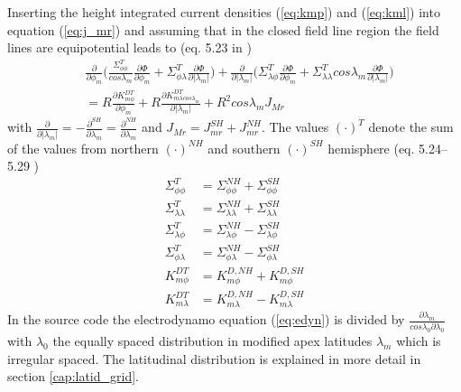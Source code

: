 %
Inserting the height integrated current densities (\ref{eq:kmp}) and 
(\ref{eq:kml}) into equation (\ref{eq:j_mr}) and assuming that in the closed field
line region the field lines are equipotential leads to (eq. 5.23 in \cite{rich95})
%
\begin{equation}
 \begin{split}
  & \frac{\partial}{\partial \phi_m} \bigl( \frac{\Sigma_{\phi \phi}^T}{cos
   \lambda_m} \frac{\partial \Phi}{\partial \phi_m} + 
   \Sigma_{\phi \lambda}^T \frac{\partial \Phi}{\partial |\lambda_m|} \bigr) +
   \frac{\partial}{\partial | \lambda_m |} \bigl( \Sigma_{\lambda \phi}^T
    \frac{\partial \Phi}{\partial \phi_m} + 
   \Sigma_{\lambda \lambda}^T cos \lambda_m 
   \frac{\partial \Phi}{\partial |\lambda_m|} \bigr) \\
  &  =
   R \frac{\partial K_{m \phi}^{DT}}{\partial \phi_m} +  
   R \frac{\partial K_{m \lambda cos \lambda_m }^{DT}}{\partial | \lambda_m |} +
   R^2 cos \lambda_m J_{Mr}
    \label{eq:edyn}
  \end{split}
\end{equation}
%
with $\frac{\partial}{\partial | \lambda_m |} = 
- \frac{\partial^{SH}}{\partial  \lambda_m } = 
 \frac{\partial^{NH}}{\partial  \lambda_m }$ and $J_{Mr} = J_{mr}^{SH} +
 J_{mr}^{NH}$.
The values $(\cdot)^T$ denote the sum of the values from northern $(\cdot)^{NH}$ and 
southern $(\cdot)^{SH}$ hemisphere (eq. 5.24--5.29 \cite{rich95})
% 
\begin{align}
  \Sigma_{\phi \phi}^T &= \Sigma_{\phi \phi}^{NH} + \Sigma_{\phi \phi}^{SH} \label{eq:nh_1}\\
  \Sigma_{\lambda \lambda}^T &= \Sigma_{\lambda \lambda}^{NH} + 
                                      \Sigma_{\lambda \lambda}^{SH}\\
  \Sigma_{\lambda \phi}^T &= \Sigma_{\lambda \phi}^{NH} - 
                                      \Sigma_{\lambda \phi}^{SH}\\
  \Sigma_{\phi\lambda}^T &= \Sigma_{ \phi\lambda}^{NH} - 
                                      \Sigma_{\phi\lambda }^{SH} \\
  K_{m \phi}^{DT} &= K_{m \phi}^{D, NH} + K_{m \phi}^{D, SH}\\
  K_{m \lambda}^{DT} &= K_{m \lambda}^{D, NH} - K_{m \lambda}^{D, SH} \label{eq:nh_6}
\end{align}
%
In the source code the electrodynamo equation (\ref{eq:edyn}) is divided by
$\frac{\partial \lambda_m}{ cos \lambda_0\partial\lambda_0}$ with $\lambda_0$ the
equally spaced distribution in modified apex latitudes $\lambda_m$ 
which is irregular spaced. The latitudinal distribution is explained 
in more detail in section \ref{cap:latid_grid}. \label{page:electro_multi}

